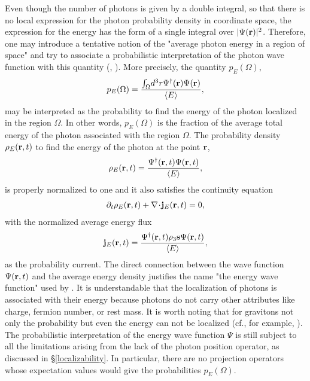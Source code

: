 \documentclass[11pt]{article}
\begin{document}
Even though the number of photons is given by a double integral, so that
there is no local expression for the photon probability density in
coordinate space, the expression for the energy has the form of a single
integral over $\vert\Psi({\bf r})\vert^2$. Therefore, one may introduce a
tentative notion of the "average photon energy in a region of space" and try
to associate a probabilistic interpretation of the photon wave function with
this quantity (\cite{IBB_94}, \cite{Sipe_95}). More precisely, the quantity
$p_E(\Omega)$,
\begin{eqnarray}
 p_E(\Omega)
 = \frac{\int_{\Omega}\!d^3r\Psi^{\dagger}({\bf r})\Psi({\bf r})}
 {\langle E\rangle},
\end{eqnarray}
may be interpreted as the probability to find the energy of the photon
localized in the region $\Omega$. In other words, $p_E(\Omega)$ is the
fraction of the average total energy of the photon associated with the
region $\Omega$. The probability density $\rho_E({\bf r},t)$ to find the
energy of the photon at the point ${\bf r}$,
\begin{eqnarray}
 \rho_E({\bf r},t)
 = \frac{\Psi^{\dagger}({\bf r}, t)\Psi({\bf r}, t)}{\langle E\rangle},
\end{eqnarray}
is properly normalized to one and it also satisfies the continuity equation
\begin{eqnarray}
 \partial_t\rho_E({\bf r},t) + {\bf\nabla}\!\cdot\!{\bf j}_E({\bf r},t) = 0,
\end{eqnarray}
with the normalized average energy flux
\begin{eqnarray}
 {\bf j}_E({\bf r},t)
 = \frac{\Psi^{\dagger}({\bf r}, t)\rho_3{\bf s}\Psi({\bf r}, t)}
 {\langle E\rangle},
\end{eqnarray}
as the probability current. The direct connection between the wave function
$\Psi({\bf r},t)$ and the average energy density justifies the name "the
energy wave function" used by \cite{MW_95}. It is understandable that the
localization of photons is associated with their energy because photons do
not carry other attributes like charge, fermion number, or rest mass. It is
worth noting that for gravitons not only the probability but even the energy
can not be localized (cf., for example, \cite{WW_80}). The probabilistic
interpretation of the energy wave function $\Psi$ is still subject to all
the limitations arising from the lack of the photon position operator, as
discussed in \S \ref{localizability}. In particular, there are no projection
operators whose expectation values would give the probabilities
$p_E(\Omega)$.
\end{document}
